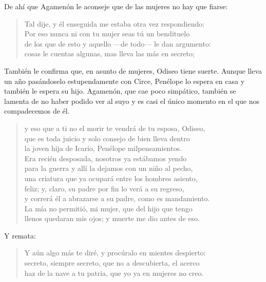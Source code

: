 \documentclass[11pt,a4paper]{article}
\begin{document}
De ahí que Agamenón le aconseje que de las mujeres no hay que fiarse:

\begin{verse}
Tal dije, y él enseguida me estaba otra vez respondiendo:\\
Por eso nunca ni con tu mujer seas tú un bendituelo\\
de los que de esto y aquello ---de todo--- le dan argumento:\\
cosas le cuentas algunas, mas lleva las más en secreto;
\end{verse}

También le confirma que, en asunto de mujeres, Odiseo tiene suerte. Aunque lleva un año pasándoselo estupendamente con Circe, Penélope lo espera en casa y también le espera su hijo. Agamenón, que cae poco simpático, también se lamenta de no haber podido ver al suyo y es casi el único momento en el que nos compadecemos de él.

\begin{verse}
y eso que a ti no el morir te vendrá de tu esposa, Odiseo,\\
que es toda juicio y solo consejo de bien lleva dentro\\
la joven hija de Icario, Penélope milpensamientos.\\
Era recién desposada, nosotros ya estábamos yendo\\
para la guerra y allí la dejamos con un niño al pecho,\\
una criatura que ya ocupará entre los hombres asiento,\\
feliz; y, claro, su padre por fin lo verá a su regreso,\\
y correrá él a abrazarse a su padre, como es mandamiento.\\
La mía no permitió, mi mujer, que del hijo que tengo\\
llenos quedaran mis ojos; y muerte me dio antes de eso.
\end{verse}

Y remata:

\begin{verse}
Y aún algo más te diré, y procúralo en mientes despierto:\\
secreto, siempre secreto, que no a descubierta, el acerco\\
haz de la nave a tu patria, que yo ya en mujeres no creo.
\end{verse}
\end{document}
